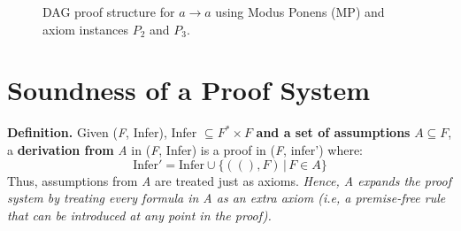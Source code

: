 \documentclass[11pt]{article}
\begin{document}
\begin{figure}[H]
    \centering
    \caption{DAG proof structure for $a \to a$ using Modus Ponens (MP) and axiom instances $P_2$ and $P_3$.}
\end{figure}

\section*{Soundness of a Proof System}

\begin{tcolorbox}[
    enhanced,
    frame hidden,
    borderline west={2pt}{0pt}{black},
    boxsep=5pt,
    left=8pt
]
\textbf{Definition.} Given (\textit{F}, Infer), Infer $\subseteq F^{*} \times F$ \textbf{and a set of assumptions} $A \subseteq F$, a \textbf{derivation from} \textit{A} in (\textit{F}, Infer) is a proof in (\textit{F}, infer') where: $$ \text{Infer}' = \text{Infer} \cup \{((), F) \, | \, F \in A\}$$ 
Thus, assumptions from \textit{A} are treated just as axioms. \emph{Hence, A expands the proof system by treating every formula in A as an extra axiom (i.e, a premise-free rule that can be introduced at any point in the proof).}
\end{tcolorbox}
\end{document}
